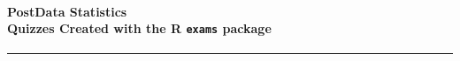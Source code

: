 \documentclass[10pt, a4paper]{article}
\makeatletter
\newcommand{\extext}[1]{\textbf{\large #1}}
\newcommand{\exnum}[9]{%
}
\newcommand{\myID}{\@ID}
\newcommand{\myDate}{\@Date}
\makeatother
\begin{document}
\thispagestyle{empty}
%
%
%
%
%


\paragraph{PostData Statistics\\[2mm]
{Quizzes}\hspace{1cm} Created with the R {\tt exams} package}
\noindent\hrule




\begin{enumerate}



\end{enumerate}
\end{document}
